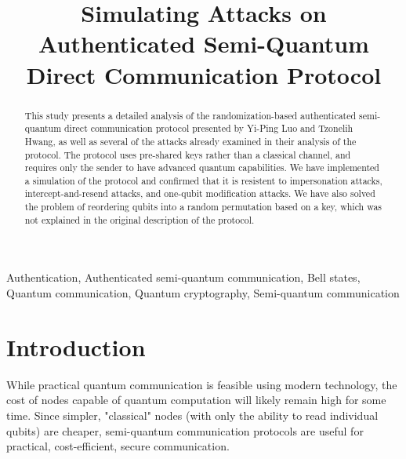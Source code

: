 \documentclass[conference,compsoc]{IEEEtran}
\begin{document}
\title{Simulating Attacks on Authenticated Semi-Quantum Direct Communication Protocol}

\author{
\and
{}
}

\maketitle

\begin{abstract}

This study presents a detailed analysis of the randomization-based authenticated semi-quantum direct
communication protocol presented by Yi-Ping Luo and Tzonelih Hwang, as well as several of the attacks
already examined in their analysis of the protocol. The protocol uses pre-shared keys
rather than a classical channel, and requires only the sender to have advanced quantum capabilities.
We have implemented a simulation of the protocol and confirmed that it is resistent to impersonation
attacks, intercept-and-resend attacks, and one-qubit modification attacks. We have also solved
the problem of reordering qubits into a random permutation based on a key,
which was not explained in the original description of the protocol.

\end{abstract}

\begin{IEEEkeywords}

Authentication,
Authenticated semi-quantum communication,
Bell states,
Quantum communication,
Quantum cryptography,
Semi-quantum communication

\end{IEEEkeywords}

\section{Introduction}

While practical quantum communication is feasible using
modern technology, the cost of nodes capable of quantum computation
will likely remain high for some time. Since simpler, "classical" nodes
(with only the ability to read individual qubits) are cheaper,
semi-quantum communication protocols are useful for practical,
cost-efficient, secure communication.
\end{document}
